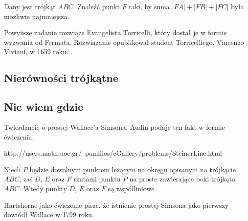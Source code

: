 \begin{problem}
	\label{punkt_fermata}
	Dany jest trójkąt $ABC$.
	Znaleźć punkt $F$ taki, by suma $|FA| + |FB| + |FC|$ była możliwie najmniejsza.
%
\end{problem}


Powyższe zadanie rozwiąże Evangelista Torricelli, który dostał je w formie wyzwania od Fermata.
%
Rozwiązanie opublikował student Torricelliego, Vincenzo Viviani, w 1659 roku.
. %


\subsection{Nierówności trójkątne}


\subsection{Nie wiem gdzie}


Twierdzneie o prostej Wallace'a-Simsona. %
Audin \cite[s. 104]{audin_2003} podaje ten fakt w formie ćwiczenia.

http://users.math.uoc.gr/~pamfilos/eGallery/problems/SteinerLine.html

\begin{proposition}
	Niech $P$ będzie dowolnym punktem leżącym na okręgu opisanym na trójkącie $ABC$, zaś $D$, $E$ oraz $F$ rzutami punktu $P$ na proste zawierające boki trójkąta $ABC$.
	Wtedy punkty $D$, $E$ oraz $F$ są współliniowe.
\end{proposition}

Hartshorne jako ćwiczenie \cite[s. 61]{hartshorne2000} pisze, że istnienie prostej Simsona jako pierwszy dowiódł Wallace w 1799 roku.


